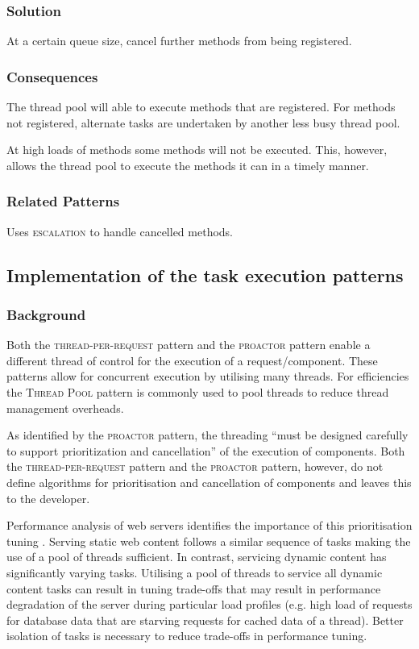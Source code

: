 \documentclass[prodmode]{style/acmlarge}
\begin{document}
\subsubsection*{Solution} At a certain queue size, cancel further methods from
being registered.

\subsubsection*{Consequences} The thread pool will able to execute methods that
are registered. For methods not registered, alternate tasks are undertaken by
another less busy thread pool.

At high loads of methods some methods will not be executed.  This, however,
allows the thread pool to execute the methods it can in a timely manner.

\subsubsection*{Related Patterns} Uses \textsc{escalation} to handle cancelled
methods.



\subsection{Implementation of the task execution patterns}

\subsubsection*{Background}

Both the \textsc{thread-per-request} pattern \cite{thread-per-request} and the
\textsc{proactor} pattern \cite{proactor} enable a different thread of control
for the execution of a request/component.  These patterns allow for concurrent
execution by utilising many threads.  For efficiencies the \textsc{Thread Pool}
pattern \cite{thread-per-request} is commonly used to pool threads to reduce
thread management overheads.

As identified by the \textsc{proactor} pattern, the threading ``must be designed
carefully to support prioritization and cancellation'' \cite[p. 8]{proactor} of
the execution of components.  Both the \textsc{thread-per-request} pattern and
the \textsc{proactor} pattern, however, do not define algorithms for
prioritisation and cancellation of components and leaves this to the developer.

Performance analysis of web servers identifies the importance of this
prioritisation tuning
\cite{tuning-important,low-server-footprint,tuning-os-important}.
Serving static web content follows a similar sequence of tasks making the use of
a pool of threads sufficient.  In contrast, servicing dynamic content has
significantly varying tasks.  Utilising a pool of threads to service all dynamic
content tasks can result in tuning trade-offs that may result in performance
degradation of the server during particular load profiles (e.g. high load of
requests for database data that are starving requests for cached data of a
thread).  Better isolation of tasks is necessary to reduce trade-offs in
performance tuning.
\end{document}
